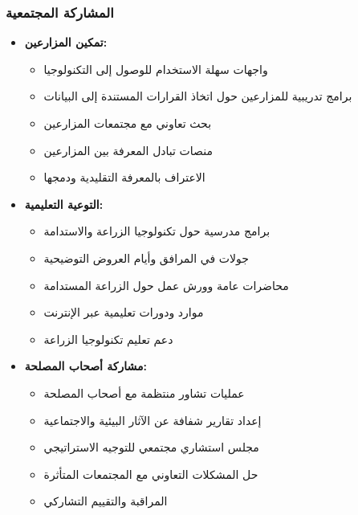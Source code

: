 \subsubsection{المشاركة المجتمعية}
\begin{itemize}
    \item \textbf{تمكين المزارعين:}
    \begin{itemize}
        \item واجهات سهلة الاستخدام للوصول إلى التكنولوجيا
        \item برامج تدريبية للمزارعين حول اتخاذ القرارات المستندة إلى البيانات
        \item بحث تعاوني مع مجتمعات المزارعين
        \item منصات تبادل المعرفة بين المزارعين
        \item الاعتراف بالمعرفة التقليدية ودمجها
    \end{itemize}
    
    \item \textbf{التوعية التعليمية:}
    \begin{itemize}
        \item برامج مدرسية حول تكنولوجيا الزراعة والاستدامة
        \item جولات في المرافق وأيام العروض التوضيحية
        \item محاضرات عامة وورش عمل حول الزراعة المستدامة
        \item موارد ودورات تعليمية عبر الإنترنت
        \item دعم تعليم تكنولوجيا الزراعة
    \end{itemize}
    
    \item \textbf{مشاركة أصحاب المصلحة:}
    \begin{itemize}
        \item عمليات تشاور منتظمة مع أصحاب المصلحة
        \item إعداد تقارير شفافة عن الآثار البيئية والاجتماعية
        \item مجلس استشاري مجتمعي للتوجيه الاستراتيجي
        \item حل المشكلات التعاوني مع المجتمعات المتأثرة
        \item المراقبة والتقييم التشاركي
    \end{itemize}
\end{itemize}

